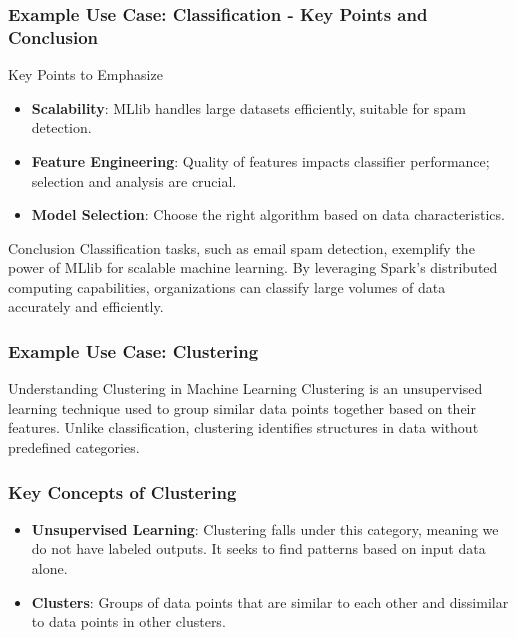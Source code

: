 \documentclass[aspectratio=169]{beamer}
\begin{document}
\begin{frame}[fragile]
    \frametitle{Example Use Case: Classification - Key Points and Conclusion}
    \begin{block}{Key Points to Emphasize}
        \begin{itemize}
            \item \textbf{Scalability}: MLlib handles large datasets efficiently, suitable for spam detection.
            \item \textbf{Feature Engineering}: Quality of features impacts classifier performance; selection and analysis are crucial.
            \item \textbf{Model Selection}: Choose the right algorithm based on data characteristics.
        \end{itemize}
    \end{block}
    
    \begin{block}{Conclusion}
        Classification tasks, such as email spam detection, exemplify the power of MLlib for scalable machine learning. By leveraging Spark’s distributed computing capabilities, organizations can classify large volumes of data accurately and efficiently.
    \end{block}
\end{frame}

\begin{frame}[fragile]
    \frametitle{Example Use Case: Clustering}
    \begin{block}{Understanding Clustering in Machine Learning}
        Clustering is an unsupervised learning technique used to group similar data points together based on their features. Unlike classification, clustering identifies structures in data without predefined categories.
    \end{block}
\end{frame}

\begin{frame}[fragile]
    \frametitle{Key Concepts of Clustering}
    \begin{itemize}
        \item \textbf{Unsupervised Learning}: Clustering falls under this category, meaning we do not have labeled outputs. It seeks to find patterns based on input data alone.
        \item \textbf{Clusters}: Groups of data points that are similar to each other and dissimilar to data points in other clusters.
    \end{itemize}
\end{frame}
\end{document}

